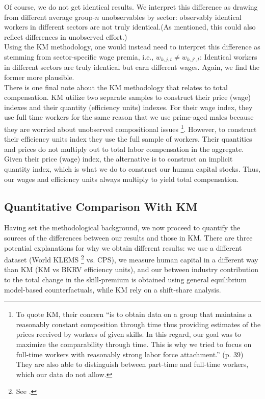 \documentclass[10pt]{article}
\begin{document}
Of course, we do not get identical results. We interpret this difference as drawing from different average group-$n$ unobservables by sector: observably identical workers in different sectors are not truly identical.(As mentioned, this could also reflect differences in unobserved effort.)\\

Using the KM methodology, one would instead need to interpret this difference as stemming from sector-specific wage premia, i.e., $w_{k,j,t}\neq w_{k,j',t}$: Identical workers in different sectors are truly identical but earn different wages. Again, we find the former more plausible.\\

There is one final note about the KM methodology that relates to total compensation. KM utilize two separate samples to construct their price (wage) indexes and their quantity (efficiency units) indexes. For their wage index, they use full time workers for the same reason that we use prime-aged males because they are worried about unobserved compositional issues \footnote{To quote KM, their concern ``is to obtain data on a group that maintains a reasonably constant composition through time thus providing estimates of the prices received by workers of given skills. In this regard, our goal was to maximize the comparability through time. This is why we tried to focus on full-time workers with reasonably strong labor force attachment.'' (p. 39) They are also able to distinguish between part-time and full-time workers, which our data do not allow.}. However, to construct their efficiency units index they use the full sample of workers. Their quantities and prices do not multiply out to total labor compensation in the aggregate. Given their price (wage) index, the alternative is to construct an implicit quantity index, which is what we do to construct our human capital stocks. Thus, our wages and efficiency units always multiply to yield total compensation. 


\medskip
\subsection{Quantitative Comparison With KM} \label{sec:quant_differences_with_KM}
Having set the methodological background, we now proceed to quantify the sources of the differences between our results and those in KM. There are three potential explanations for why we obtain different results: we use a different dataset (World KLEMS \footnote{See \citet{JHS_WorldKLEMS}.} vs. CPS), we measure human capital in a different way than KM (KM vs BKRV efficiency units), and our between industry contribution to the total change in the skill-premium is obtained using general equilibrium model-based counterfactuals, while KM rely on a shift-share analysis.\\
\end{document}
